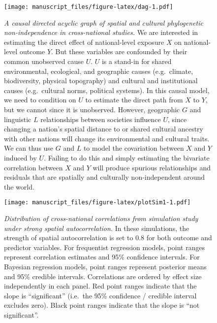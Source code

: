 \documentclass[english,man,floatsintext]{apa6}
\begin{document}
\begin{figure}
\centering
\texttt{[image: manuscript\_files/figure-latex/dag-1.pdf]}
\caption{\label{fig:dag}\emph{A causal directed acyclic graph of spatial and cultural phylogenetic non-independence in cross-national studies.} We are interested in estimating the direct effect of national-level exposure \(X\) on national-level outcome \(Y\). But these variables are confounded by their common unobserved cause \(U\). \(U\) is a stand-in for shared environmental, ecological, and geographic causes (e.g.~climate, biodiversity, physical topography) and cultural and institutional causes (e.g.~cultural norms, political systems). In this causal model, we need to condition on \(U\) to estimate the direct path from \(X\) to \(Y\), but we cannot since it is unobserved. However, geographic \(G\) and linguistic \(L\) relationships between societies influence \(U\), since changing a nation's spatial distance to or shared cultural ancestry with other nations will change its environmental and cultural traits. We can thus use \(G\) and \(L\) to model the covariation between \(X\) and \(Y\) induced by \(U\). Failing to do this and simply estimating the bivariate correlation between \(X\) and \(Y\) will produce spurious relationships and residuals that are spatially and culturally non-independent around the world.}
\end{figure}

\newpage



\begin{figure}
\centering
\texttt{[image: manuscript\_files/figure-latex/plotSim1-1.pdf]}
\caption{\label{fig:plotSim1}\emph{Distribution of cross-national correlations from simulation study under strong spatial autocorrelation.} In these simulations, the strength of spatial autocorrelation is set to 0.8 for both outcome and predictor variables. For frequentist regression models, point ranges represent correlation estimates and 95\% confidence intervals. For Bayesian regression models, point ranges represent posterior means and 95\% credible intervals. Correlations are ordered by effect size independently in each panel. Red point ranges indicate that the slope is \enquote{significant} (i.e.~the 95\% confidence / credible interval excludes zero). Black point ranges indicate that the slope is \enquote{not significant}.}
\end{figure}

\newpage
\end{document}
